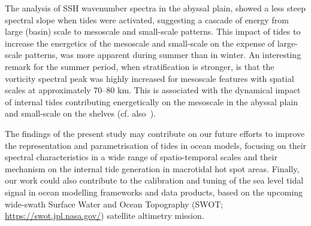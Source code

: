 \documentclass[jmse,article,accept,moreauthors,pdftex]{Definitions/mdpi}
\begin{document}
The analysis of SSH wavenumber spectra in the abyssal plain, showed a less steep spectral slope when tides were activated, suggesting a cascade of energy from large (basin) scale to mesoscale and small-scale patterns. This impact of tides to increase the energetics of the mesoscale and small-scale on the expense of large-scale patterns, was more apparent during summer than in winter. An interesting remark for the summer period, when stratification is stronger, is that the vorticity spectral peak was highly increased for mesoscale features with spatial scales at approximately 70--80 km. This is associated with the dynamical impact of internal tides contributing energetically on the mesoscale in the abyssal plain and small-scale on the shelves (cf. also~\cite{Pairaud2010,lelong_kunze_2013}).

The findings of the present study may contribute on our future efforts to improve the representation and parametrisation of tides in ocean models, focusing on their spectral characteristics in a wide range of spatio-temporal scales and their mechanism on the internal tide generation in macrotidal hot spot areas. Finally, our work could also contribute to the calibration and tuning of the sea level tidal signal in ocean modelling frameworks and data products, based on the upcoming wide-swath Surface Water and Ocean Topography (SWOT; \url{https://swot.jpl.nasa.gov/}) satellite altimetry mission.


\vspace{6pt} 

\end{document}
